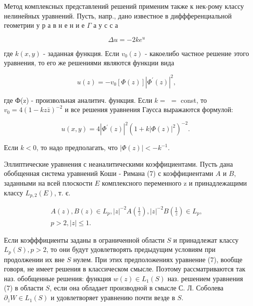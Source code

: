 \documentclass[10pt]{article}
\begin{document}
Метод комплексных представлений решений применим также к нек-рому классу нелинейных уравнений. Пусть, напр., дано известное в диффференциальной геометрии у р а в н е н и е $\Gamma$ а у с с а



\[

\Delta u=-2 k e^{u}

\]



где $k(x, y)$ - заданная функция. Если $v_{0}(z)$ - какоелибо частное решение этого уравнения, то его же решениями являются функции вида



\[

u(z)=-v_{0}[\Phi(z)]\left|\Phi^{\prime}(z)\right|^{2},

\]



где Ф(z) - произвольная аналитич. функция. Если $k=$ $=$ const, то $v_{0}=4(1-k z \bar{z})^{-2}$ и все решения уравнения Гаусса выражаются формулой:



\[

u(x, y)=4\left|\Phi^{\prime}(z)\right|^{2}\left(1+k|\Phi(z)|^{2}\right)^{-2} \text {. }

\]



Если $k<0$, то надо предполагать, что $|\Phi(z)|<-k^{-1}$.



Эллиптические уравнения с неаналитическими коэффициентами. Пусть дана обобщенная система уравнений Коши - Римана (7) с коэффициентами $A$ и $B$, заданными на всей плоскости $E$ комплексного переменного z и принадлежащими классу $L_{p, 2}(E)$, т. є.



\[

\begin{gathered}

A(z), B(z) \in L_{p},|z|^{-2} A\left(\frac{1}{z}\right),|z|^{-2} B\left(\frac{1}{z}\right) \in L_{p}, \\

p>2,|z| \leqslant 1 .

\end{gathered}

\]



Если коэфффициенты заданы в ограниченной области $S$ и принадлежат классу $L_{p}(S), p>2$, то они будут удовлетворять предыдущим условиям при продолжении их вне $S$ нулем. При этих предположениях уравнение (7), вообще говоря, не имеет решения в классическом смысле. Поэтому рассматриваются так наз. обобщенные решения: функция $w(z) \in L_{1}(S)$ наз. решением уравнения (7) в области $S$, если она обладает производной в смысле С. Л. Соболева $\partial_{\bar{z}} W \in L_{1}(S)$ и удовлетворяет уравнению почти везде в $S$.
\end{document}
